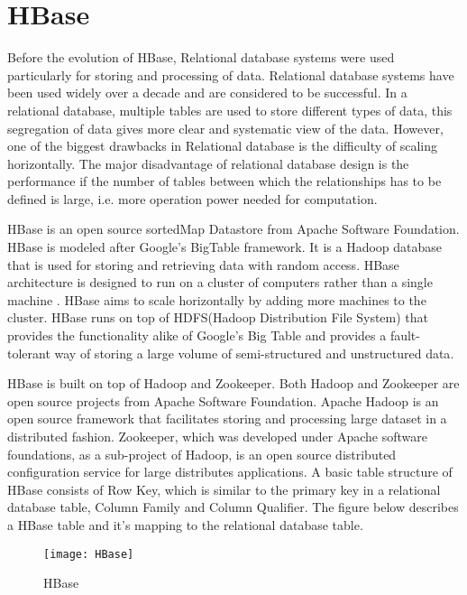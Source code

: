 \documentclass[11pt,a4paper,bibtotoc,idxtotoc,headsepline,footsepline,footexclude,BCOR12mm,DIV13]{scrbook}
\begin{document}
\newpage
\section{HBase}
\label{sec:hbase}

Before the evolution of HBase, Relational database systems were used particularly for storing and processing of data. Relational database systems have been used widely over a decade and are considered to be successful. In a relational database, multiple tables are used to store different types of data, this segregation of data gives more clear and systematic view of the data\cite{relational:dbs}. However, one of the biggest drawbacks in Relational database is the difficulty of scaling horizontally. The major disadvantage of relational database design is the performance if the number of tables between which the relationships has to be defined is large, i.e. more operation power needed for computation\cite{relational:dbs}. 

HBase is an open source sortedMap Datastore from Apache Software Foundation. HBase is modeled after Google's BigTable framework. It is a Hadoop database that is used for storing and retrieving data with random access. HBase architecture is designed to run on a cluster of computers rather than a single machine \cite{coprocessor:detail}. HBase aims to scale horizontally by adding more machines to the cluster. HBase runs on top of HDFS(Hadoop Distribution File System) that provides the functionality alike of Google's Big Table and provides a fault-tolerant way of storing a large volume of semi-structured and unstructured data\cite{bigdata:analysis}.

HBase is built on top of Hadoop and Zookeeper\cite{coprocessor:detail}. Both Hadoop and Zookeeper are open source projects from Apache Software Foundation. Apache Hadoop is an open source framework that facilitates storing and processing large dataset in a distributed fashion. Zookeeper, which was developed under Apache software foundations, as a sub-project of Hadoop, is an open source distributed configuration service for large distributes applications. A basic table structure of HBase consists of Row Key, which is similar to the primary key in a relational database table, Column Family and Column Qualifier. The figure below describes a HBase table and it's mapping to the relational database table.


\begin{figure}
	\centering
	\texttt{[image: HBase]}
	\caption{HBase}
	\label{fig:HBase}
\end{figure}
\end{document}
